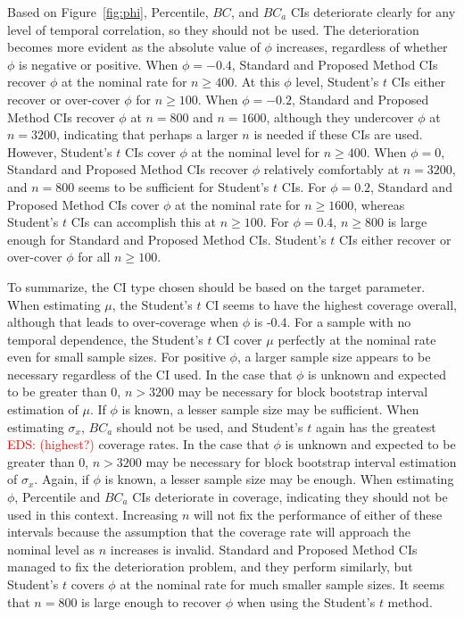 \documentclass[12pt, letterpaper, titlepage]{article}
\newcommand{\eds}[1]{\textcolor{red}{EDS: (#1)}}
\begin{document}
Based on Figure~\ref{fig:phi}, 
Percentile, %
$BC$, and $BC_a$ CIs deteriorate clearly for any level of temporal correlation,
so they should not be used. The deterioration becomes more evident
as the absolute value of $\phi$ increases, regardless of whether $\phi$ is 
negative or positive. When $\phi = -0.4$, Standard and Proposed Method CIs 
recover $\phi$ at the nominal rate for $n \geq 400$. At this $\phi$ level,
Student's $t$ CIs either recover or over-cover $\phi$ for $n \geq 100$. When
$\phi = -0.2$, Standard and Proposed Method CIs recover $\phi$ at $n = 800$ and 
$n = 1600$, 
although they undercover $\phi$ at $n = 3200$, indicating that 
perhaps a larger $n$ is needed if these CIs are used. However,
Student's $t$ CIs cover $\phi$ at the nominal level for $n \geq 400$. When
$\phi = 0$, Standard and Proposed Method CIs recover $\phi$ relatively 
comfortably at $n = 3200$, and 
$n = 800$ seems to be sufficient for Student's $t$ CIs. For $\phi = 0.2$, Standard
and Proposed Method CIs cover $\phi$ at the nominal rate for $n \geq 1600$, whereas 
Student's $t$ CIs can accomplish this at $n \geq 100$. For $\phi = 0.4$, $n \geq 
800$ is large enough for Standard and Proposed Method CIs. Student's $t$ CIs either
recover or over-cover $\phi$ for all $n \geq 100$.

To summarize, the CI type chosen should be based on the target parameter. 
When estimating $\mu$, the Student's $t$ CI seems to have the highest coverage
overall, although that leads to over-coverage when $\phi$ is -0.4. For a
sample with no temporal dependence, the Student's $t$ CI cover $\mu$ perfectly
at the nominal rate even for small sample sizes. For positive $\phi$, a larger
sample size appears to be necessary regardless of the CI used. In the case
that $\phi$ is unknown and expected to be greater than $0$, $n > 3200$ may be
necessary for block bootstrap interval estimation of $\mu$. If $\phi$ is known,
a lesser sample size may be sufficient. When estimating $\sigma_x$,
$BC_a$ should not be used, and Student's $t$ again has the greatest 
\eds{highest?} coverage
rates. In the case that $\phi$ is unknown and expected to be greater than $0$,
$n > 3200$ may be necessary for block bootstrap interval estimation of
$\sigma_x$. Again, if $\phi$ is known, a lesser sample size may be enough.
When estimating $\phi$, Percentile and $BC_a$ CIs 
deteriorate in coverage, indicating they should not be used in this context. 
Increasing $n$ will not fix the performance of either of these intervals 
because the assumption that the coverage rate will approach the nominal level
as $n$ increases is invalid. Standard and Proposed Method CIs managed to fix the
deterioration problem, and they perform similarly, but Student's $t$ covers
$\phi$ at the nominal rate for much smaller sample sizes. It seems that 
$n = 800$ is large enough to
recover $\phi$ when using the Student's $t$ method.
\end{document}
